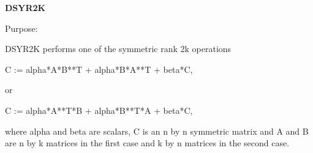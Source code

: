 {\bfseries D\+S\+Y\+R2\+K} 

\begin{DoxyParagraph}{Purpose\+: }
\begin{DoxyVerb} DSYR2K  performs one of the symmetric rank 2k operations

    C := alpha*A*B**T + alpha*B*A**T + beta*C,

 or

    C := alpha*A**T*B + alpha*B**T*A + beta*C,

 where  alpha and beta  are scalars, C is an  n by n  symmetric matrix
 and  A and B  are  n by k  matrices  in the  first  case  and  k by n
 matrices in the second case.\end{DoxyVerb}
 
\end{DoxyParagraph}

